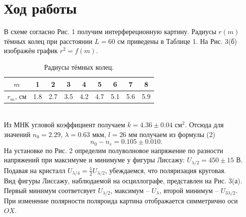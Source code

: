 \documentclass[a4paper,12pt]{article}
\begin{document}
\section*{Ход работы}
В схеме согласно Рис. 1 получим интерфереционную картину. Радиусы $r(m)$ тёмных колец при расстоянии $L = 60 \text{ см}$ приведены в Таблице 1. На Рис. 3(б) изображён график $r^2 = f(m)$.
\begin{table}[h]
\begin{tabular}{|c|c|c|c|c|c|c|c|c|}
\hline
$m$     & 1   & 2   & 3   & 4   & 5   & 6   & 7   & 8   \\ \hline
$r_m$, см & 1.8 & 2.7 & 3.5 & 4.2 & 4.7 & 5.1 & 5.6 & 5.9 \\ \hline
\end{tabular}
\centering
\caption{Радиусы тёмных колец.}
\end{table}\\
Из МНК угловой коэффициент получаем $k = 4.36 \pm 0.04 \text{ см}^2$. Отсюда для значений $n_0 = 2.29$, $\lambda = 0.63 \text{ мкм}$, $l = 26 \text{ мм}$ получаем из формулы (2)
$$
n_0 - n_e = 0.105\pm 0.010. 
$$  
На установке по Рис. 2 определим полуволновое напряжение по разности напряжений при максимуме и минимуме у фигуры Лиссажу: $U_{\lambda/2} = 450 \pm 15 \text{ В}$. 
Подавая на кристалл $U_{\lambda/4} = \frac{1}{2}U_{\lambda/2}$, убеждаемся, что поляризация круговая.\\
Вид фигуры Лиссажу, наблюдаемой на осциллографе, представлен на Рис. 3(а). Первый минимум соответсвует $U_{\lambda/2}$, максимум -- $U_{\lambda}$, второй минимум -- $U_{3\lambda/2}$. При изменение полярности поляроида картина отображается симметрично оси $OX$.
\end{document}
